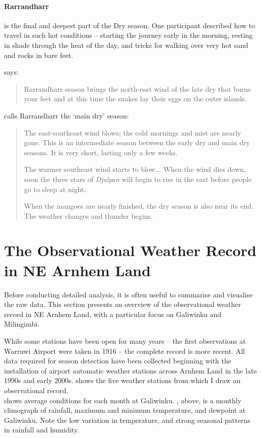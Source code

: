 \paragraph{Rarrandharr} is the final and deepest part of the Dry season.
One participant described how to travel in such hot conditions -- starting
the journey early in the morning, resting in shade through the heat of the
day, and tricks for walking over very hot sand and rocks in bare feet.

\citet[][p36]{atlas2014} says: \blockquote{
    Rarrandharr season brings the north-east wind of the late dry that
    burns your feet and at this time the snakes lay their eggs on the
    outer islands.
}

\citet{davis1989} calls Rarrandharr the `main dry' season:
\blockquote{
    The east-southeast wind blows; the cold mornings and mist are nearly gone.
    This is an intermediate season between the early dry and main dry seasons.
    It is very short, lasting only a few weeks.

    The warmer southeast wind starts to blow...
    When the wind dies down, soon the three stars of \textit{Djulpan}
    will begin to rise in the east before people go to sleep at night.

    When the mangoes are nearly finished, the dry season is also near its end.
    The weather changes and thunder begins.
}




\section{The Observational Weather Record in NE Arnhem Land}

Before conducting detailed analysis, it is often useful to summarise and
visualise the raw data.  This section presents an overview of the
observational weather record in NE Arnhem Land, with a particular focus
on Galiwinku and Milingimbi.

While some stations have been open for many years -- the first observations
at Warruwi Airport were taken in 1916 -- the complete record is more recent.
All data required for season detection have been collected beginning with
the installation of airport automatic weather stations across Arnhem Land
in the late 1990s and early 2000s.   shows
the five weather stations from which I draw an observational record.\\


 shows average conditions for each
month at Galiwinku.  , above, is a monthly
climograph of rainfall, maximum and minimum temperature, and dewpoint at
Galiwinku.  Note the low variation in temperature, and strong seasonal
patterns in rainfall and humidity.

